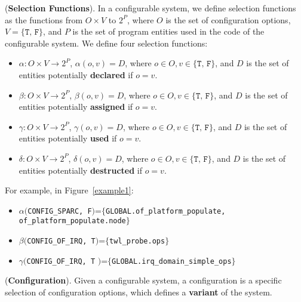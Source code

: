\begin{Definition}{({\bf Selection Functions}).}
In a configurable system, we define selection functions as the
functions from $O\times V$ to $2^P$, where $O$ is the set of
configuration options, $V=\{\texttt{T, F}\}$, and $P$ is the set of program
entities used in the code of the configurable system. We define four selection functions:

\begin{itemize}[leftmargin=4mm]

\item $\alpha: O \times V \to 2^P$, $\alpha(o, v) = D$, where $o \in O, v \in \{\texttt{T, F}\}$, and $D$ is the set of entities potentially {\bf declared} if $o = v$.

\item $\beta: O \times V \to 2^P$, $\beta(o, v) = D$, where $o \in O, v \in \{\texttt{T, F}\}$, and $D$ is the set of entities potentially {\bf assigned} if $o = v$.

\item $\gamma: O \times V \to 2^P$, $\gamma(o, v) = D$, where $o \in O, v \in \{\texttt{T, F}\}$, and $D$ is the set of entities potentially {\bf used} if $o = v$.

\item $\delta: O \times V \to 2^P$, $\delta(o, v) = D$, where $o \in O, v \in \{\texttt{T, F}\}$, and $D$ is the set of entities potentially {\bf destructed} if $o = v$.
\end{itemize}

\end{Definition}

For example, in Figure~\ref{example1}:

\begin{itemize}

\item $\alpha($\texttt{CONFIG\_SPARC, F}$)$=$\{$\texttt{GLOBAL.of\_platform\_populate, of\_platform\_populate.node}$\}$

\item $\beta($\texttt{CONFIG\_OF\_IRQ, T}$)$=$\{$\texttt{twl\_probe.ops}$\}$

\item $\gamma($\texttt{CONFIG\_OF\_IRQ, T} $)$=$\{$\texttt{GLOBAL.irq\_domain\_simple\_ops}$\}$

\end{itemize}

\begin{Definition}{({\bf Configuration}).}
Given a configurable system, a configuration is a specific
selection of configuration options, which defines a \textbf{variant}
of the system.
\end{Definition}

